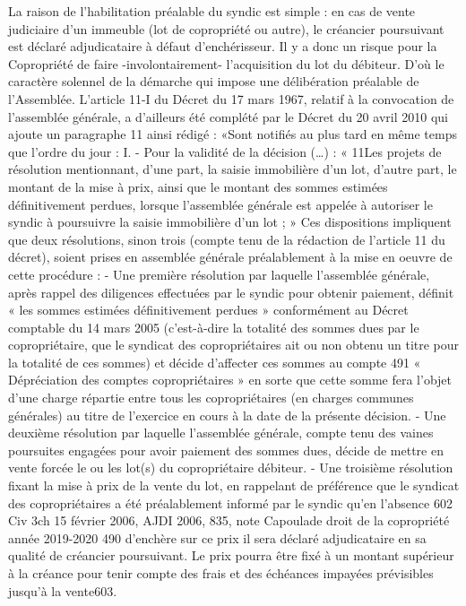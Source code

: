 La raison de l’habilitation préalable du syndic est simple : en cas de vente judiciaire d'un immeuble (lot de copropriété ou autre), le créancier poursuivant est déclaré adjudicataire à défaut d'enchérisseur. Il y a donc un risque pour la Copropriété de faire -involontairement- l'acquisition du lot du débiteur. D'où le caractère solennel de la démarche qui impose une délibération préalable de l'Assemblée.
L’article 11-I du Décret du 17 mars 1967, relatif à la convocation de l’assemblée générale, a d’ailleurs été complété par le Décret du 20 avril 2010 qui ajoute un paragraphe 11 ainsi rédigé :
«Sont notifiés au plus tard en même temps que l'ordre du jour :
I. - Pour la validité de la décision (…) :
« 11\degres Les projets de résolution mentionnant, d’une part, la saisie immobilière d’un lot, d’autre part, le montant de la mise à prix, ainsi que le montant des sommes estimées définitivement perdues, lorsque l’assemblée générale est appelée à autoriser le syndic à poursuivre la saisie immobilière d’un lot ; »
Ces dispositions impliquent que deux résolutions, sinon trois (compte tenu de la rédaction de l’article 11 du décret), soient prises en assemblée générale préalablement à la mise en oeuvre de cette procédure :
- Une première résolution par laquelle l’assemblée générale, après rappel des diligences effectuées par le syndic pour obtenir paiement, définit « les sommes estimées définitivement perdues » conformément au Décret comptable du 14 mars 2005 (c'est-à-dire la totalité des sommes dues par le copropriétaire, que le syndicat des copropriétaires ait ou non obtenu un titre pour la totalité de ces sommes) et décide d’affecter ces sommes au compte 491 « Dépréciation des comptes copropriétaires » en sorte que cette somme fera l’objet d’une charge répartie entre tous les copropriétaires (en charges communes générales) au titre de l’exercice en cours à la date de la présente décision.
- Une deuxième résolution par laquelle l’assemblée générale, compte tenu des vaines poursuites engagées pour avoir paiement des sommes dues, décide de mettre en vente forcée le ou les lot(s) du copropriétaire débiteur.
- Une troisième résolution fixant la mise à prix de la vente du lot, en rappelant de préférence que le syndicat des copropriétaires a été préalablement informé par le syndic qu’en l’absence
602 Civ 3\degres ch 15 février 2006, AJDI 2006, 835, note Capoulade
droit de la copropriété année 2019-2020
490
d’enchère sur ce prix il sera déclaré adjudicataire en sa qualité de créancier poursuivant. Le prix pourra être fixé à un montant supérieur à la créance pour tenir compte des frais et des échéances impayées prévisibles jusqu’à la vente603.

